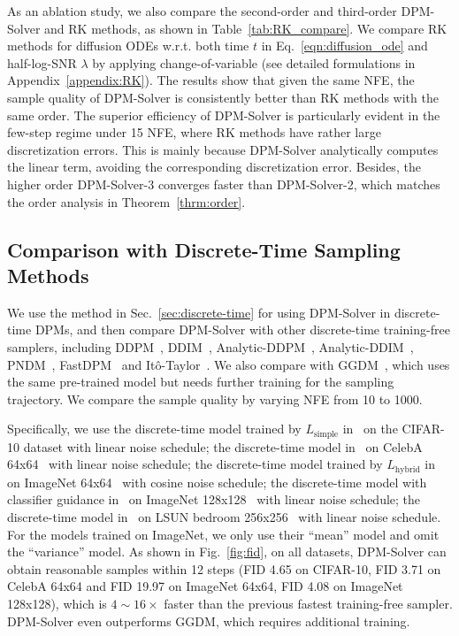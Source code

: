 As an ablation study, 
we also compare the second-order and third-order DPM-Solver and RK methods, as shown in Table~\ref{tab:RK_compare}. We compare RK methods for diffusion ODEs w.r.t. both time $t$ in Eq.~\eqref{eqn:diffusion_ode} and half-log-SNR $\lambda$ by applying change-of-variable (see detailed formulations in Appendix~\ref{appendix:RK}). The results show that given the same NFE, the sample quality of DPM-Solver is consistently better than RK methods with the same order. The superior efficiency of DPM-Solver is particularly evident in the few-step regime under 15 NFE, where RK methods have rather large discretization errors. 
This is mainly because DPM-Solver analytically computes the linear term, avoiding the corresponding discretization error. 
Besides, the higher order DPM-Solver-3 converges faster than DPM-Solver-2, which matches  the order analysis in Theorem~\ref{thrm:order}.


\subsection{Comparison with Discrete-Time Sampling Methods}
We use the method in Sec.~\ref{sec:discrete-time} for using DPM-Solver in discrete-time DPMs, and then compare DPM-Solver with other discrete-time training-free samplers, including DDPM~\citep{ho2020denoising}, DDIM~\citep{song2020denoising}, Analytic-DDPM~\citep{bao2022analytic}, Analytic-DDIM~\citep{bao2022analytic}, PNDM~\citep{liu2022pseudo}, FastDPM~\citep{kong2021fast} and It\^o-{T}aylor~\citep{tachibana2021taylor}. We also compare with GGDM~\citep{watson2021learning}, which uses the same pre-trained model but needs further training for the sampling trajectory.
We compare the sample quality by varying NFE from 10 to 1000.


Specifically, we use the discrete-time model trained by $L_{\text{simple}}$ in~\citep{ho2020denoising} on the CIFAR-10 dataset with linear noise schedule; the discrete-time model in~\citep{song2020denoising} on CelebA 64x64~\citep{liu2015deep} with linear noise schedule; the discrete-time model trained by $L_{\text{hybrid}}$ in~\citep{nichol2021improved} on ImageNet 64x64~\citep{deng2009imagenet} with cosine noise schedule; the discrete-time model with classifier guidance in~\citep{dhariwal2021diffusion} on ImageNet 128x128~\citep{deng2009imagenet} with linear noise schedule; the discrete-time model in~\citep{dhariwal2021diffusion} on LSUN bedroom 256x256~\citep{yu2015lsun} with linear noise schedule. For the models trained on ImageNet, we only use their ``mean'' model and omit the ``variance'' model. As shown in Fig.~\ref{fig:fid}, 
on all  datasets, DPM-Solver can obtain reasonable samples within 12 steps (FID 4.65 on CIFAR-10, FID 3.71 on CelebA 64x64 and FID 19.97 on ImageNet 64x64, FID 4.08 on ImageNet 128x128), which is $4\sim 16 \times$ faster than the previous fastest training-free sampler.
DPM-Solver even outperforms GGDM, which requires additional training. 



